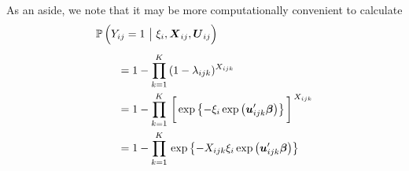 \documentclass[11pt]{article}
\newcommand{\prob}{\mathbb{P}\,}
\renewcommand{\vec}{\boldsymbol}
\begin{document}
As an aside, we note that it may be more computationally convenient to calculate
\begin{align*} \MoveEqLeft
\prob\Big( Y_{ij} = 1 ~\big|~ \xi_i, \vec{X}_{ij}, \vec{U}_{ij}  \Big) \\[1ex]
&= 1 - \prod_{k=1}^K\, (1 - \lambda_{ijk})^{X_{ijk}} \\
&= 1 - \prod_{k=1}^K\, \bigg[ \exp \left\{ -\xi_i \exp\left( \vec{u}_{ijk}^\prime \vec{\beta} \right) \right\} \bigg]^{\,X_{ijk}} \\
&= 1 - \prod_{k=1}^K\, \exp \left\{ -X_{ijk} \xi_i \exp\left( \vec{u}_{ijk}^\prime \vec{\beta} \right) \right\} \\
\end{align*}





\end{document}
